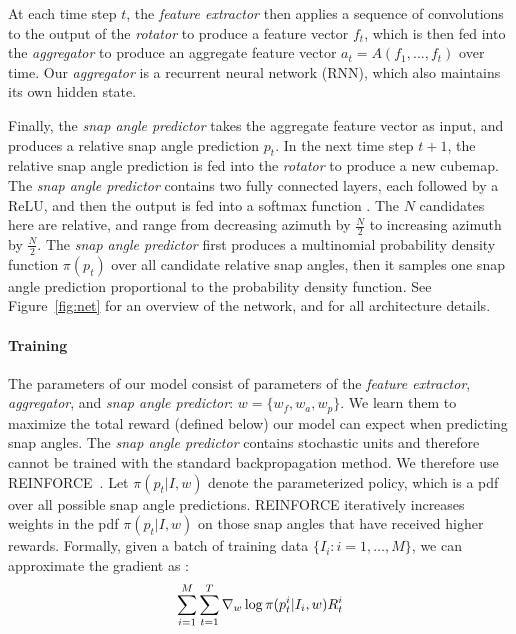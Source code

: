 At each time step $t$, the \textit{feature extractor} then applies a sequence of convolutions to the output of the \textit{rotator} to produce a feature vector $f_t$, which is then fed into the \textit{aggregator} to produce an aggregate feature vector $a_t=A(f_1,...,f_t)$ over time. Our \textit{aggregator} is a recurrent neural network (RNN), which also maintains its own hidden state.

Finally, the \textit{snap angle predictor} takes the aggregate feature vector as input, and produces a relative snap angle prediction $p_{t}$. In the next time step $t+1$, the relative snap angle prediction is fed into the \textit{rotator} to produce a new cubemap. The \textit{snap angle predictor} contains two fully connected  layers, each followed by a ReLU, and then the output is fed into a softmax function . 
The $N$ candidates here are relative, and range from decreasing azimuth by $\frac{N}{2}$ to increasing azimuth by $\frac{N}{2}$.  
The \emph{snap angle predictor} first produces a multinomial probability density function $\pi(p_t)$ over all candidate relative snap angles, then it samples one snap angle prediction proportional to the probability density function.  See Figure~\ref{fig:net} for an overview of the network, and  %
 for all architecture details.




\vspace*{-0.1in}
\paragraph{Training}
The parameters of our model consist of parameters of the \textit{feature extractor}, \textit{aggregator}, and \textit{snap angle predictor}: $w=\{w_f, w_a, w_p\}$.  We learn them to maximize the total reward (defined below) our model can expect when predicting snap angles. The \textit{snap angle predictor} contains stochastic units and therefore cannot be trained with the standard backpropagation method.  We therefore use REINFORCE~\cite{williams1992simple}.  Let $\pi(p_t|I, w)$ denote the parameterized policy, which is a pdf over all possible snap angle predictions. REINFORCE iteratively increases weights in the pdf $\pi(p_t|I, w)$ on those snap angles that have received higher rewards. Formally, given a batch of training data $\{I_i:i=1,\dots,M\}$, we can approximate the gradient as :
\begin{equation}
\sum_{i=1}^{\textcolor{black}{M}} \sum_{t=1}^{T} \nabla_w \log \pi(p^i_t| I_{i}, w)R^i_t
\end{equation}



